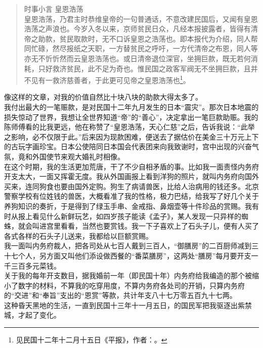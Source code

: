 \begin{quote}
	时事小言 皇恩浩荡\\

皇恩浩荡，乃君主时恭维皇帝的一句普通话，不意改建民国后，又闻有皇恩浩荡之声浪也。今岁入冬以来，京师贫民日众，凡经本报披露者，皆得有清帝之助款，贫民取款时，无不口诉皇恩之浩荡也。即本报代为介绍，同人帮同忙碌，然尽报纸之天职，一方替贫民之呼吁，一方代清帝之布恩，同人等亦无不忻忻然而云皇恩浩荡也。或日清帝退位深官，坐拥巨款，既无若何消耗，只好救济贫民，此不足为奇也。惟民国之政客军阀无不坐拥巨款，且并不见有一救济慈善者，于此更可见帝之皇恩浩荡也\footnote{见民国十二年十二月十五日《平报》，作者：。}。
\end{quote}

像这样的文章，对我的价值自然比十块八块的助款大得太多了。\\

我付出最大的一笔赈款，是对民国十二年九月发生的日本“震灾”。那次日本地震的损失惊动了世界，我想让全世界知道“帝”的“善心”，决定拿出一笔巨款助赈。我的陈师傅看的比我更远，他在称赞了“皇恩浩荡，天心仁慈”之后，告诉我说：“此举之影响，必不仅限于此。”后来因为现款困难，便送去了据估价在美金三十万元上下的古玩字画珍宝。日本公使陪同日本国会代表团来向我致谢时，宫中出现的兴奋气氛，竟和外国使节来观大婚礼时相像。\\

在这个时期，我的生活更加荒唐，干了不少自相矛盾的事。比如我一面责怪内务府开支太大，一面又挥霍无度。我从外国画报上看到洋狗的照片，就叫内务府向国外买来，连同狗食也要由国外定购。狗生了病请兽医，比给人治病用的钱还多。北京警察学校有位姓钱的兽医，大概看准了我的性格，极力巴结，给我写了好几个关于养狗知识的奏折，于是得到了绿玉手串、金戒指、鼻烟壶等十件珍品的赏赐。我有时从报上看见什么新鲜玩艺，如四岁孩子能读《孟子》，某人发现一只异样的蜘蛛，就会叫进宫里看看，当然也要赏钱。我一下子喜欢上了石头子儿，便有人买了各式各样的石头子儿送来，我都给以巨额赏赐。\\

我一面叫内务府裁人，把各司处从七百人戴到三百人，“御膳房”的二百厨师减到三十七个人，另方面又叫他们添设做西餐的“番菜膳房”，这两处“膳房”每月要开支一千三百多元菜钱。\\

关于我的每年开支数目，据我婚前一年（即民国十年）内务府给我编造的那个被缩小了数字的材料，不算我的吃穿用度，不算内务府各处司的开销，只算内务府的“交进”和“奉旨”支出的“恩赏”等款，共计年支八十七万零五百九十七两。\\

这种昏天黑地的生活，一直到民国十三年十一月五日，的国民军把我驱逐出紫禁城，才起了变化。\\

